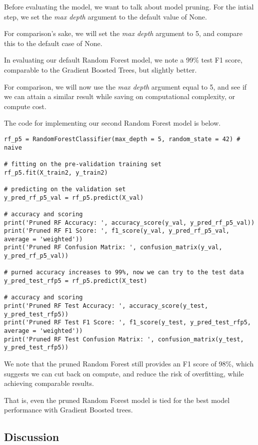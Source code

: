 \documentclass[12pt, letterpaper]{article}
\begin{document}
Before evaluating the model, we want to talk about model pruning. For the intial step, we set the \textit{max depth} argument to the default value of None. 

For comparison's sake, we will set the \textit{max depth} argument to 5, and compare this to the default case of None. 

In evaluating our default Random Forest model, we note a 99\% test F1 score, comparable to the Gradient Boosted Trees, but slightly better. 

For comparison, we will now use the \textit{max depth} argument equal to 5, and see if we can attain a similar result while saving on computational complexity, or compute cost. 

The code for implementing our second Random Forest model is below. 

\begin{verbatim}
rf_p5 = RandomForestClassifier(max_depth = 5, random_state = 42) # naive 

# fitting on the pre-validation training set 
rf_p5.fit(X_train2, y_train2) 

# predicting on the validation set 
y_pred_rf_p5_val = rf_p5.predict(X_val) 

# accuracy and scoring 
print('Pruned RF Accuracy: ', accuracy_score(y_val, y_pred_rf_p5_val)) 
print('Pruned RF F1 Score: ', f1_score(y_val, y_pred_rf_p5_val, average = 'weighted')) 
print('Pruned RF Confusion Matrix: ', confusion_matrix(y_val, y_pred_rf_p5_val)) 

# purned accuracy increases to 99%, now we can try to the test data 
y_pred_test_rfp5 = rf_p5.predict(X_test) 

# accuracy and scoring 
print('Pruned RF Test Accuracy: ', accuracy_score(y_test, y_pred_test_rfp5)) 
print('Pruned RF Test F1 Score: ', f1_score(y_test, y_pred_test_rfp5, average = 'weighted')) 
print('Pruned RF Test Confusion Matrix: ', confusion_matrix(y_test, y_pred_test_rfp5)) 
\end{verbatim}

We note that the pruned Random Forest still provides an F1 score of 98\%, which suggests we can cut back on compute, and reduce the risk of overfitting, while achieving comparable results. 

That is, even the pruned Random Forest model is tied for the best model performance with Gradient Boosted trees. 

\subsection{Discussion}
\end{document}

